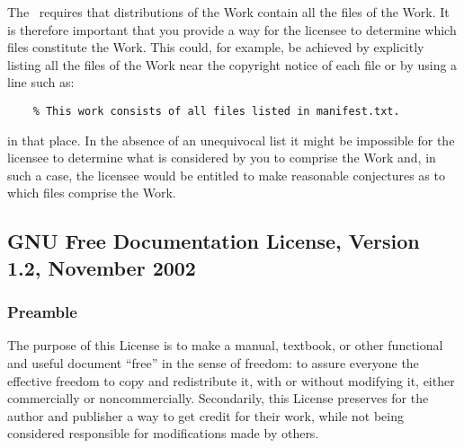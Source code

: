 \begin{LPPLicense}
    \label{LPPL:Recommendations}


    The \LPPL\ requires that distributions of the Work contain all the files of
    the Work.  It is therefore important that you provide a way for the
    licensee to determine which files constitute the Work.  This could, for
    example, be achieved by explicitly listing all the files of the Work near
    the copyright notice of each file or by using a line such as:
\begin{verbatim}
    % This work consists of all files listed in manifest.txt.
\end{verbatim}
    in that place.  In the absence of an unequivocal list it might be
    impossible for the licensee to determine what is considered by you to
    comprise the Work and, in such a case, the licensee would be entitled to
    make reasonable conjectures as to which files comprise the Work.
\end{LPPLicense}


\subsection{GNU Free Documentation License, Version 1.2, November 2002}
\label{label_fdl}


\subsubsection{Preamble}

The purpose of this License is to make a manual, textbook, or other functional
and useful document ``free'' in the sense of freedom: to assure everyone the
effective freedom to copy and redistribute it, with or without modifying it,
either commercially or noncommercially. Secondarily, this License preserves for
the author and publisher a way to get credit for their work, while not being
considered responsible for modifications made by others.

